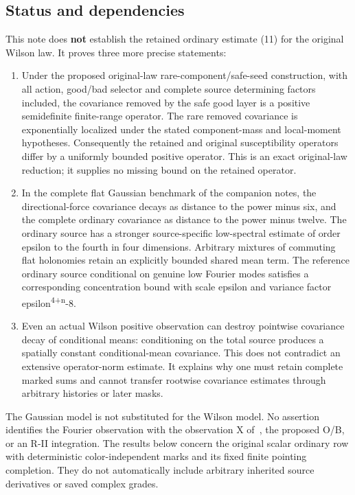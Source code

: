 \documentclass[
  11pt,
]{article}
\providecommand{\tightlist}{%
  \setlength{\itemsep}{0pt}\setlength{\parskip}{0pt}}
\begin{document}
\hypertarget{status-and-dependency-ledger}{%
\subsection{Status and
dependencies}\label{status-and-dependency-ledger}}

This note does \textbf{not} establish the retained ordinary estimate
(11) for the original Wilson law. It proves three more precise
statements:

\begin{enumerate}
\def\labelenumi{\arabic{enumi}.}
\tightlist
\item
  Under the proposed original-law rare-component/safe-seed construction,
  with all action, good/bad selector and complete source determining
  factors included, the covariance removed by the safe good layer is a
  positive semidefinite finite-range operator. The rare removed
  covariance is exponentially localized under the stated component-mass
  and local-moment hypotheses. Consequently the retained and original
  susceptibility operators differ by a uniformly bounded positive
  operator. This is an exact original-law reduction; it supplies no
  missing bound on the retained operator.
\item
  In the complete flat Gaussian benchmark of the
  companion notes, the directional-force covariance decays as
  distance to the power minus six, and the complete ordinary covariance
  as distance to the power minus twelve. The ordinary source has a
  stronger source-specific low-spectral estimate of order epsilon to the
  fourth in four dimensions. Arbitrary mixtures of commuting flat
  holonomies retain an explicitly bounded shared mean term. The
  reference ordinary source conditional on genuine low Fourier modes
  satisfies a corresponding concentration bound with scale epsilon and
  variance factor epsilon\textsuperscript{4+n}-8.
\item
  Even an actual Wilson positive observation can destroy pointwise
  covariance decay of conditional means: conditioning on the total
  source produces a spatially constant conditional-mean covariance. This
  does not contradict an extensive operator-norm estimate. It explains
  why one must retain complete marked sums and cannot transfer rootwise
  covariance estimates through arbitrary histories or later masks.
\end{enumerate}

The Gaussian model is not substituted for the Wilson model. No assertion
identifies the Fourier observation with the observation X of~\cite{CT}, the proposed O/B, or an
R-II integration. The results below concern the original scalar ordinary
row with deterministic color-independent marks and its fixed finite
pointing completion. They do not automatically include arbitrary
inherited source derivatives or saved complex grades.
\end{document}
